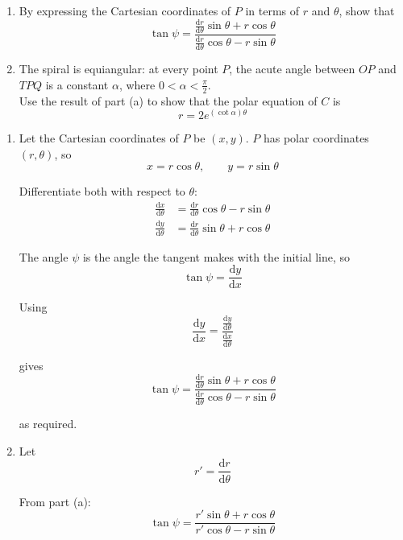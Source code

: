 \documentclass[leqno]{article}
\begin{document}
\begin{enumerate}[
  label=\textbf{\arabic*.},
  leftmargin=*,
  topsep=0pt,
  partopsep=0pt,
  parsep=0pt
]
\begin{enumerate}[label=\textbf{(\alph*)}]
  \item By expressing the Cartesian coordinates of $P$ in terms of $r$ and $\theta$, show that
  \[
  \tan \psi = \frac{\frac{\mathrm{d}r}{\mathrm{d}\theta}\sin\theta + r\cos\theta}{\frac{\mathrm{d}r}{\mathrm{d}\theta}\cos\theta - r\sin\theta}
  \]
  \item The spiral is equiangular: at every point $P$, the acute angle between $OP$ and $TPQ$ is a constant $\alpha$, where $0 < \alpha < \frac{\pi}{2}$. \\

  Use the result of part (a) to show that the polar equation of $C$ is
  \[
  r = 2e^{(\cot \alpha)\theta}
  \]
\end{enumerate}

\vspace*{10pt}

\begin{djsSolution}
\begin{enumerate}[label=\textbf{(\alph*)}]
  \item Let the Cartesian coordinates of \(P\) be \((x,y)\).  
  \(P\) has polar coordinates \((r,\theta)\), so
  \[
  x=r\cos\theta,\qquad y=r\sin\theta
  \]

  Differentiate both with respect to \(\theta\):
  \begin{align*}
  \frac{\mathrm{d}x}{\mathrm{d}\theta}
  &= \frac{\mathrm{d}r}{\mathrm{d}\theta}\cos\theta-r\sin\theta \\
  \frac{\mathrm{d}y}{\mathrm{d}\theta}
  &= \frac{\mathrm{d}r}{\mathrm{d}\theta}\sin\theta+r\cos\theta
  \end{align*}

  The angle \(\psi\) is the angle the tangent makes with the initial line, so
  \[
  \tan\psi=\frac{\mathrm{d}y}{\mathrm{d}x}
  \]

  Using
  \[
  \frac{\mathrm{d}y}{\mathrm{d}x}=\frac{\frac{\mathrm{d}y}{\mathrm{d}\theta}}{\frac{\mathrm{d}x}{\mathrm{d}\theta}}
  \]

  gives
  \[
  \tan\psi
  =\frac{\frac{\mathrm{d}r}{\mathrm{d}\theta}\sin\theta+r\cos\theta}{\frac{\mathrm{d}r}{\mathrm{d}\theta}\cos\theta-r\sin\theta}
  \]

  as required.

  \item Let
  \[
  r'=\frac{\mathrm{d}r}{\mathrm{d}\theta}
  \]

  From part (a):
  \[
  \tan\psi=\frac{r'\sin\theta+r\cos\theta}{r'\cos\theta-r\sin\theta}
  \]


\end{enumerate}
\end{djsSolution}
\end{enumerate}
\end{document}

